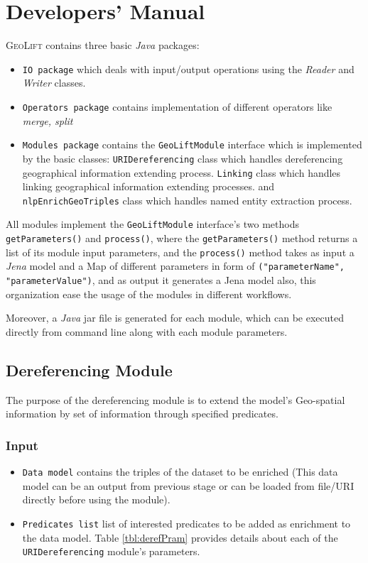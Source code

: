 \documentclass[a4paper,twoside,bibtotoc,abstracton,12pt,BCOR=15mm]{article}
\newcommand{\geolift}{\textsc{GeoLift}\xspace}
\begin{document}
\section{Developers' Manual}
\geolift contains three basic \emph{Java} packages: 
\begin{itemize}
 \item \texttt{IO package} which deals with input/output operations using the \emph{Reader} and \emph{Writer} classes.
 \item\texttt{Operators package} contains implementation of different operators like \emph{merge, split} 
 \item\texttt{Modules package} contains the \texttt{GeoLiftModule} interface which is implemented by the basic classes: 
  \texttt{URIDereferencing} class which handles dereferencing  geographical information extending process. 
 \texttt{Linking} class which handles linking geographical information extending processes. 
 and \texttt{nlpEnrichGeoTriples} class which handles named entity extraction process.
\end{itemize}

 All modules implement the \texttt{GeoLiftModule} interface's two methods \texttt{getParameters()} and \texttt{process()},
 where the \texttt{getParameters()} method returns a list of its module input parameters,
 and the \texttt{process()} method takes as input a \emph{Jena} model and a Map of different parameters in form of \texttt{("parameterName", "parameterValue")},
 and as output it generates a Jena model also, this organization ease the usage of the modules in different workflows.

 Moreover, a \emph{Java} jar file is generated for each module, which can be executed directly from command line along with each module parameters.
 
\subsection{Dereferencing Module}
 The purpose of the dereferencing module is to extend the model's Geo-spatial information by set of information through specified predicates.

\subsubsection{Input}
\begin{itemize}
 \item \texttt{Data model} contains the triples of the dataset to be enriched 
 (This data model can be an output from previous stage or can be loaded from file/URI directly before using the module). 
 \item \texttt{Predicates list} list of interested predicates to be added as enrichment to the data model.
 Table \ref{tbl:derefPram} provides details about each of the \texttt{URIDereferencing} module's parameters.
\end{itemize}
\end{document}
